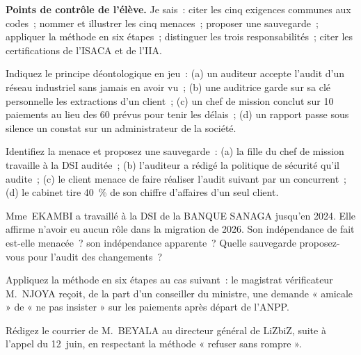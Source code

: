 \begin{boxinfo}
\textbf{Points de contrôle de l'élève.} Je sais~: citer les cinq exigences
communes aux codes~; nommer et illustrer les cinq menaces~; proposer une
sauvegarde~; appliquer la méthode en six étapes~; distinguer les trois
responsabilités~; citer les certifications de l'ISACA et de l'IIA.
\end{boxinfo}

\bigskip

\begin{boxexo}[title={\ding{45}\quad Exercice~16.1. Quel principe~? \niveaubase}]
Indiquez le principe déontologique en jeu~: (a) un auditeur accepte
l'audit d'un réseau industriel sans jamais en avoir vu~; (b) une auditrice
garde sur sa clé personnelle les extractions d'un client~; (c) un chef de
mission conclut sur 10 paiements au lieu des 60 prévus pour tenir les
délais~; (d) un rapport passe sous silence un constat sur un administrateur
de la société.
\end{boxexo}

\begin{boxexo}[title={\ding{45}\quad Exercice~16.2. Quelle menace~? \niveaubase}]
Identifiez la menace et proposez une sauvegarde~: (a) la fille du chef de
mission travaille à la DSI auditée~; (b) l'auditeur a rédigé la politique
de sécurité qu'il audite~; (c) le client menace de faire réaliser
l'audit suivant par un concurrent~; (d) le cabinet tire 40~\% de son
chiffre d'affaires d'un seul client.
\end{boxexo}

\begin{boxexo}[title={\ding{45}\quad Exercice~16.3. Fait ou apparence \niveaumoyen}]
Mme~EKAMBI a travaillé à la DSI de la BANQUE SANAGA jusqu'en 2024. Elle
affirme n'avoir eu aucun rôle dans la migration de 2026. Son indépendance
de fait est-elle menacée~? son indépendance apparente~? Quelle sauvegarde
proposez-vous pour l'audit des changements~?
\end{boxexo}

\begin{boxexo}[title={\ding{45}\quad Exercice~16.4. Les six étapes \niveaumoyen}]
Appliquez la méthode en six étapes au cas suivant~: le magistrat
vérificateur M.~NJOYA reçoit, de la part d'un conseiller du ministre, une
demande « amicale » de « ne pas insister » sur les paiements après départ
de l'ANPP.
\end{boxexo}

\begin{boxexo}[title={\ding{45}\quad Exercice~16.5. Le courrier de M.~BEYALA \niveaumoyen}]
Rédigez le courrier de M.~BEYALA au directeur général de LiZbiZ, suite à
l'appel du 12~juin, en respectant la méthode « refuser sans rompre ».
\end{boxexo}

